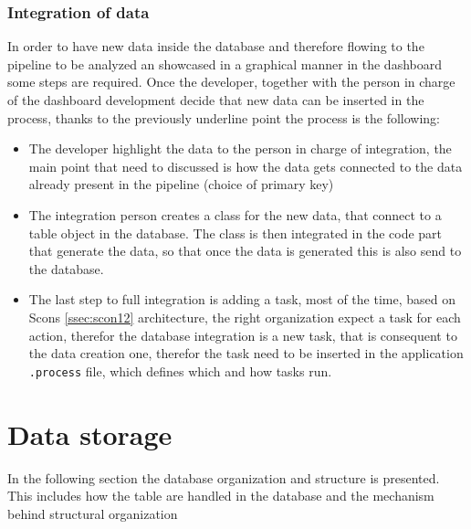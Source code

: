 \documentclass[../main.tex]{subfiles}
\begin{document}
\subsubsection{Integration of data}
In order to have new data inside the database and therefore flowing to the pipeline to be analyzed an showcased in a graphical manner in the dashboard some steps are required. Once the developer, together with the person in charge of the dashboard development decide that new data can be inserted in the process, thanks to the previously underline point the process is the following:
\begin{itemize}
    \item The developer highlight the data to the person in charge of integration, the main point that need to discussed is how the data gets connected to the data already present in the pipeline (choice of primary key)
    \item The integration person creates a class for the new data, that connect to a table object in the database. The class is then integrated in the code part that generate the data, so that once the data is generated this is also send to the database.
    \item The last step to full integration is adding a task, most of the time, based on Scons \ref{ssec:scon12} architecture, the right organization expect a task for each action, therefor the database integration is a new task, that is consequent to the data creation one, therefor the task need to be inserted in the application \texttt{.process} file, which defines which and how tasks run. 
\end{itemize}
\section{Data storage}
In the following section the database organization and structure is presented. This includes how the table are handled in the database and the mechanism behind structural organization
\end{document}
